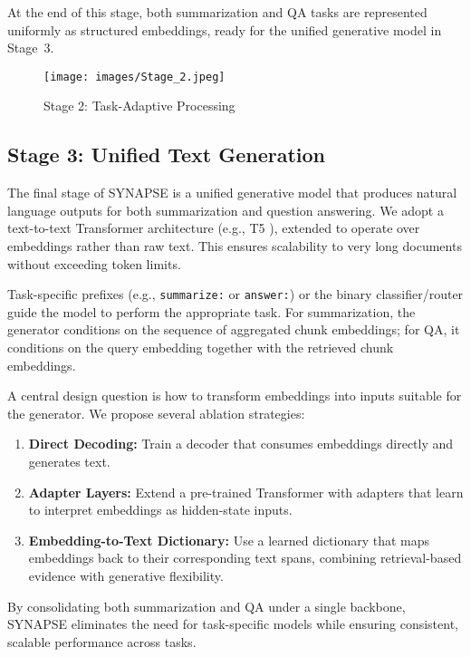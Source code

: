 \documentclass[11pt]{article}
\begin{document}
At the end of this stage, both summarization and QA tasks are represented uniformly as structured embeddings, ready for the unified generative model in Stage~3.

\begin{figure}[H]
    \centering
    \texttt{[image: images/Stage\_2.jpeg]}
    \caption*{Stage 2: Task-Adaptive Processing}
    \label{fig:stage2}
\end{figure}

\subsection{Stage 3: Unified Text Generation}
The final stage of SYNAPSE is a unified generative model that produces natural language outputs for both summarization and question answering. We adopt a text-to-text Transformer architecture (e.g., T5 \citep{raffel2023exploringlimitstransferlearning}), extended to operate over embeddings rather than raw text. This ensures scalability to very long documents without exceeding token limits.

Task-specific prefixes  (e.g., \texttt{summarize:} or \texttt{answer:}) or the binary classifier/router guide the model to perform the appropriate task. For summarization, the generator conditions on the sequence of aggregated chunk embeddings; for QA, it conditions on the query embedding together with the retrieved chunk embeddings.

A central design question is how to transform embeddings into inputs suitable for the generator. We propose several ablation strategies:
\begin{enumerate}
    \item \textbf{Direct Decoding:} Train a decoder that consumes embeddings directly and generates text.
    \item \textbf{Adapter Layers:} Extend a pre-trained Transformer with adapters that learn to interpret embeddings as hidden-state inputs.
    \item \textbf{Embedding-to-Text Dictionary:} Use a learned dictionary that maps embeddings back to their corresponding text spans, combining retrieval-based evidence with generative flexibility.
\end{enumerate}

By consolidating both summarization and QA under a single backbone, SYNAPSE eliminates the need for task-specific models while ensuring consistent, scalable performance across tasks.
\end{document}
